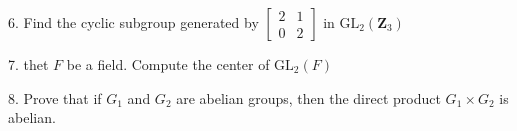 \begin{mdframed}[style=darkQuesion]
  6. Find the cyclic subgroup generated by $\left[\begin{array}{ll}2 & 1 \\ 0 & 2\end{array}\right]$ in $\mathrm{GL}_{2}\left(\mathbf{Z}_{3}\right)$
\end{mdframed}
\begin{mdframed}[style=darkAnswer,frametitle={Joe Starr}]
  
\end{mdframed}
\newpage
\begin{mdframed}[style=darkQuesion]
  7. thet $F$ be a field. Compute the center of $\mathrm{GL}_{2}(F)$
\end{mdframed}
\begin{mdframed}[style=darkAnswer,frametitle={Joe Starr}]
  
\end{mdframed}
\newpage
\begin{mdframed}[style=darkQuesion]
  8. Prove that if $G_{1}$ and $G_{2}$ are abelian groups, then the direct product $G_{1} \times G_{2}$ is abelian.
\end{mdframed}
\begin{mdframed}[style=darkAnswer,frametitle={Joe Starr}]
  
\end{mdframed}
\newpage
